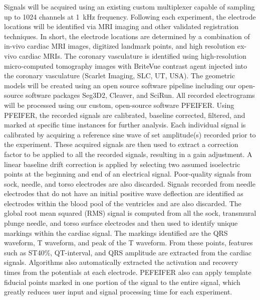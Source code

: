 Signals will be acquired using an existing custom multiplexer capable of sampling up to 1024 channels at 1~kHz frequency. Following each experiment, the electrode locations will be identified via MRI imaging and other validated registration techniques.\cite{BLZ:Zen2018a} In short, the electrode locations are determined by a combination of in-vivo cardiac MRI images, digitized landmark points, and high resolution ex-vivo cardiac MRIs. The coronary vasculature is identified using high-resolution micro-computed tomography images with BriteVue contrast agent injected into the coronary vasculature (Scarlet Imaging, SLC, UT, USA). The geometric models will be created using an open source software pipeline including our open-source software packages Seg3D2, Cleaver, and SciRun. All recorded electrograms will be processed using our custom, open-source software PFEIFER.\cite{RSM:Rod2018} Using PFEIFER, the recorded signals are calibrated, baseline corrected, filtered, and marked at specific time instances for further analysis. Each individual signal is calibrated by acquiring a reference sine wave of set amplitude(s) recorded prior to the experiment. These acquired signals are then used to extract a correction factor to be applied to all the recorded signals, resulting in a gain adjustment. A linear baseline drift correction is applied by selecting two assumed isoelectric points at the beginning and end of an electrical signal. Poor-quality signals from sock, needle, and torso electrodes are also discarded. Signals recorded from needle electrodes that do not have an initial positive wave deflection are identified as electrodes within the blood pool of the ventricles and are also discarded. The global root mean squared (RMS) signal is computed from all the sock, transmural plunge needle, and torso surface electrodes and then used to identify unique markings within the cardiac signal. The markings identified are the QRS waveform, T waveform, and peak of the T waveform. From these points, features such as ST40\%, QT-interval, and QRS amplitude are extracted from the cardiac signals. Algorithms also automatically extracted the activation and recovery times from the potentials at each electrode. PEFEIFER also can apply template fiducial points marked in one portion of the signal to the entire signal, which greatly reduces user input and signal processing time for each experiment.  


